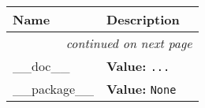     \vspace{-1cm}
\hspace{\varindent}\begin{longtable}{|p{\varnamewidth}|p{\vardescrwidth}|l}
\cline{1-2}
\cline{1-2} \centering \textbf{Name} & \centering \textbf{Description}& \\
\cline{1-2}
\endhead\cline{1-2}\multicolumn{3}{r}{\small\textit{continued on next page}}\\\endfoot\cline{1-2}
\endlastfoot\raggedright \_\-\_\-d\-o\-c\-\_\-\_\- & \raggedright \textbf{Value:} 
{\tt \texttt{...}}&\\
\cline{1-2}
\raggedright \_\-\_\-p\-a\-c\-k\-a\-g\-e\-\_\-\_\- & \raggedright \textbf{Value:} 
{\tt None}&\\
\cline{1-2}
\end{longtable}

